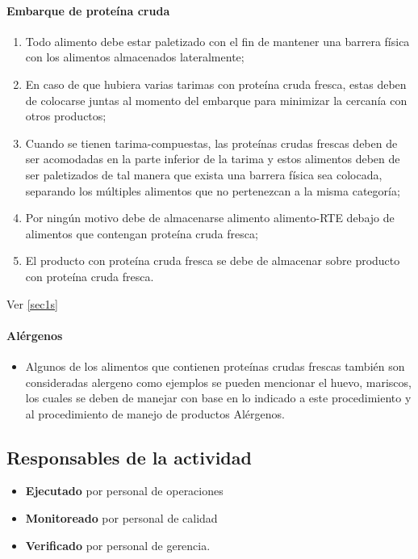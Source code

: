 \paragraph{Embarque de proteína cruda}

\begin{enumerate}
	\item Todo alimento debe estar paletizado con el fin de mantener una barrera física con los alimentos almacenados lateralmente;\label{sec1s}
	\item En caso de que hubiera varias tarimas con proteína cruda fresca, estas deben de colocarse juntas al momento del embarque para minimizar la cercanía con otros productos;
	\item Cuando se tienen \glspl{tarima-compuesta}, las proteínas crudas frescas deben de ser acomodadas en la parte inferior de la tarima y estos alimentos deben de ser paletizados de tal manera que exista una barrera física sea colocada, separando los múltiples alimentos que no pertenezcan a la misma categoría;
	\item Por ningún motivo debe de almacenarse alimento \gls{alimento-RTE} debajo de alimentos que contengan proteína cruda fresca;
	\item El producto con proteína cruda fresca se debe de almacenar sobre producto con proteína cruda fresca.
\end{enumerate}

Ver \cref{sec1s}

\paragraph{Alérgenos}

\begin{itemize}
	\item Algunos de los alimentos que contienen proteínas crudas frescas también son consideradas \gls{alergeno} como ejemplos se pueden mencionar el huevo, mariscos, los cuales se deben de manejar con base en lo indicado a este procedimiento y al procedimiento de manejo de productos Alérgenos.
\end{itemize}

\subsection{Responsables de la actividad}

\begin{itemize}
	\item \textbf{Ejecutado} por personal de operaciones
	\item \textbf{Monitoreado} por personal de calidad
	\item \textbf{Verificado} por personal de gerencia.
\end{itemize}

